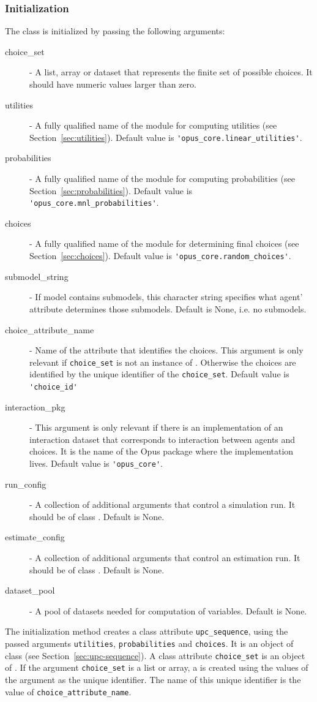 {\subsubsection{Initialization}
%
The class is initialized by passing the following arguments:
\begin{description}
\item[choice_set] - A list, array or dataset \datasetindex that represents the finite set of
  possible choices. It should have numeric values larger than zero.
\item[utilities] - A fully qualified name of the module for computing utilities
  (see Section~\ref{sec:utilities}). Default value is
  \verb|'opus_core.linear_utilities'|.
\item[probabilities] - A fully qualified name of the module for computing
  probabilities (see Section~\ref{sec:probabilities}). Default value is
  \verb|'opus_core.mnl_probabilities'|.
\item[choices] - A fully qualified name of the module for determining
  final choices (see Section~\ref{sec:choices}). Default value is
  \verb|'opus_core.random_choices'|.
\item[submodel_string] - If model contains submodels, this character string
  specifies what agent' attribute \attributesindex determines those submodels. Default is None, i.e. no submodels.
\item[choice_attribute_name] - Name of the attribute \attributesindex that identifies the
  choices. This argument is only relevant if \verb|choice_set| is not an
  instance of . \datasetindex Otherwise the choices are identified by the
  unique identifier of the \verb|choice_set|. Default value is
  \verb|'choice_id'|
\item[interaction_pkg] - This argument is only relevant if there is an
  implementation of an interaction dataset that corresponds to interaction
  between agents and choices. It is the name of the Opus package where the implementation lives.
  Default value is \verb|'opus_core'|.
\item[run_config] - A collection of additional arguments that control a
  simulation run. It should be of class . Default is None.
\item[estimate_config] - A collection of additional arguments that control an
  estimation run. It should be of class . Default is None.
\item[dataset_pool] - A pool of datasets needed for computation of variables. Default is None.
\end{description}
The initialization method creates a class attribute \attributesindex \verb|upc_sequence|, using
the passed arguments \verb|utilities|, \verb|probabilities| and
\verb|choices|. It is an object of class  (see
Section~\ref{sec:upc-sequence}). A class attribute \attributesindex \verb|choice_set| is an
object of . \datasetindex If the argument \verb|choice_set| is a list or
array, a  \datasetindex is created using the values of the argument as the
unique identifier. The name of this unique identifier is the value of \verb|choice_attribute_name|. \attributesindex

}
